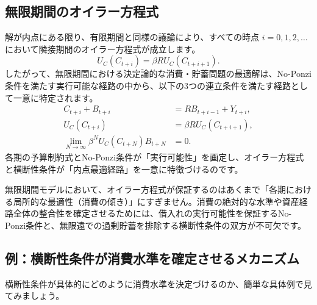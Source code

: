 \documentclass[
  japanese,
  lualatex,
  ja=standard,
  12pt,
  a4paper]{ltjsarticle}
\begin{document}
\subsection{無限期間のオイラー方程式}\label{ux7121ux9650ux671fux9593ux306eux30aaux30a4ux30e9ux30fcux65b9ux7a0bux5f0f}

解が内点にある限り、有限期間と同様の議論により、すべての時点
\(i=0, 1, 2, \dots\) において隣接期間のオイラー方程式が成立します。 \[
U_C(C_{t+i}) = \beta R U_C(C_{t+i+1}).
\]
したがって、無限期間における決定論的な消費・貯蓄問題の最適解は、No-Ponzi条件を満たす実行可能な経路の中から、以下の3つの連立条件を満たす経路として一意に特定されます。
\[
\begin{aligned}
C_{t+i} + B_{t+i} &= R B_{t+i-1} + Y_{t+i},\\
U_C(C_{t+i}) &= \beta R U_C(C_{t+i+1}),\\
\lim_{N\to\infty} \beta^N U_C(C_{t+N}) B_{t+N} &= 0.
\end{aligned}
\]
各期の予算制約式とNo-Ponzi条件が「実行可能性」を画定し、オイラー方程式と横断性条件が「内点最適経路」を一意に特徴づけるのです。

\begin{tcolorbox}[enhanced jigsaw, arc=.35mm, bottomrule=.15mm, bottomtitle=1mm, breakable, colback=white, colbacktitle=quarto-callout-warning-color!10!white, colframe=quarto-callout-warning-color-frame, coltitle=black, left=2mm, leftrule=.75mm, opacityback=0, opacitybacktitle=0.6, rightrule=.15mm, title=\textcolor{quarto-callout-warning-color}{\faExclamationTriangle}\hspace{0.5em}{オイラー方程式だけでは解は定まらない}, titlerule=0mm, toprule=.15mm, toptitle=1mm]

無限期間モデルにおいて、オイラー方程式が保証するのはあくまで「各期における局所的な最適性（消費の傾き）」にすぎません。消費の絶対的な水準や資産経路全体の整合性を確定させるためには、借入れの実行可能性を保証するNo-Ponzi条件と、無限遠での過剰貯蓄を排除する横断性条件の双方が不可欠です。

\end{tcolorbox}

\subsection{例：横断性条件が消費水準を確定させるメカニズム}\label{ux4f8bux6a2aux65adux6027ux6761ux4ef6ux304cux6d88ux8cbbux6c34ux6e96ux3092ux78baux5b9aux3055ux305bux308bux30e1ux30abux30cbux30baux30e0}

横断性条件が具体的にどのように消費水準を決定づけるのか、簡単な具体例で見てみましょう。
\end{document}
